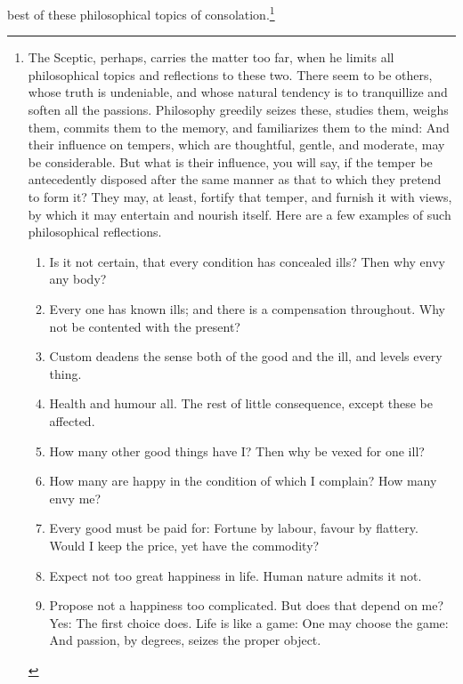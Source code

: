 best of these philosophical topics of consolation.\footnote{The
Sceptic, perhaps, carries the matter too far, when he limits all
philosophical topics and reflections to these two. There seem to be
others, whose truth is undeniable, and whose natural tendency is to
tranquillize and soften all the passions. Philosophy greedily seizes
these, studies them, weighs them, commits them to the memory, and
familiarizes them to the mind: And their influence on tempers, which
are thoughtful, gentle, and moderate, may be considerable. But what is
their influence, you will say, if the temper be antecedently disposed
after the same manner as that to which they pretend to form it? They
may, at least, fortify that temper, and furnish it with views, by
which it may entertain and nourish itself. Here are a few examples of
such philosophical reflections.

\begin{enumerate}

\item Is it not certain, that every condition has concealed ills? Then
why envy any body?

\item Every one has known ills; and there is a compensation
throughout. Why not be contented with the present?

\item Custom deadens the sense both of the good and the ill, and
levels every thing.

\item Health and humour all. The rest of little consequence, except
these be affected.

\item How many other good things have I? Then why be vexed for one
ill?

\item How many are happy in the condition of which I complain? How
many envy me?

\item Every good must be paid for: Fortune by labour, favour by
flattery. Would I keep the price, yet have the commodity?

\item Expect not too great happiness in life. Human nature admits it
not.

\item Propose not a happiness too complicated. But does that depend on
me? Yes: The first choice does. Life is like a game: One may choose
the game: And passion, by degrees, seizes the proper object.


\end{enumerate}}
